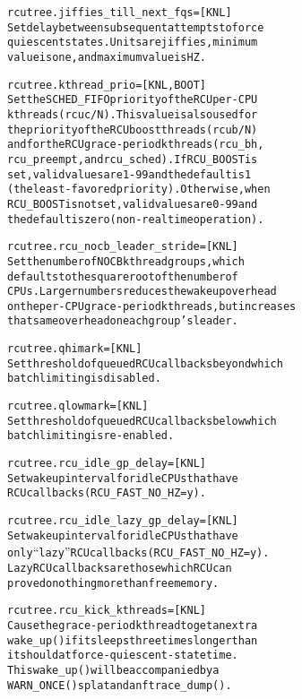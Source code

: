 \documentclass[a4paper,8pt,english]{sphinxmanual}
\begin{document}
\begin{alltt}
        rcutree.jiffies\_till\_next\_fqs= {[}KNL{]}
                        Set delay between subsequent attempts to force
                        quiescent states.  Units are jiffies, minimum
                        value is one, and maximum value is HZ.

        rcutree.kthread\_prio=    {[}KNL,BOOT{]}
                        Set the SCHED\_FIFO priority of the RCU per-CPU
                        kthreads (rcuc/N). This value is also used for
                        the priority of the RCU boost threads (rcub/N)
                        and for the RCU grace-period kthreads (rcu\_bh,
                        rcu\_preempt, and rcu\_sched). If RCU\_BOOST is
                        set, valid values are 1-99 and the default is 1
                        (the least-favored priority).  Otherwise, when
                        RCU\_BOOST is not set, valid values are 0-99 and
                        the default is zero (non-realtime operation).

        rcutree.rcu\_nocb\_leader\_stride= {[}KNL{]}
                        Set the number of NOCB kthread groups, which
                        defaults to the square root of the number of
                        CPUs.  Larger numbers reduces the wakeup overhead
                        on the per-CPU grace-period kthreads, but increases
                        that same overhead on each group's leader.

        rcutree.qhimark= {[}KNL{]}
                        Set threshold of queued RCU callbacks beyond which
                        batch limiting is disabled.

        rcutree.qlowmark= {[}KNL{]}
                        Set threshold of queued RCU callbacks below which
                        batch limiting is re-enabled.

        rcutree.rcu\_idle\_gp\_delay= {[}KNL{]}
                        Set wakeup interval for idle CPUs that have
                        RCU callbacks (RCU\_FAST\_NO\_HZ=y).

        rcutree.rcu\_idle\_lazy\_gp\_delay= {[}KNL{]}
                        Set wakeup interval for idle CPUs that have
                        only ``lazy'' RCU callbacks (RCU\_FAST\_NO\_HZ=y).
                        Lazy RCU callbacks are those which RCU can
                        prove do nothing more than free memory.

        rcutree.rcu\_kick\_kthreads= {[}KNL{]}
                        Cause the grace-period kthread to get an extra
                        wake\_up() if it sleeps three times longer than
                        it should at force-quiescent-state time.
                        This wake\_up() will be accompanied by a
                        WARN\_ONCE() splat and an ftrace\_dump().


\end{alltt}
\end{document}

